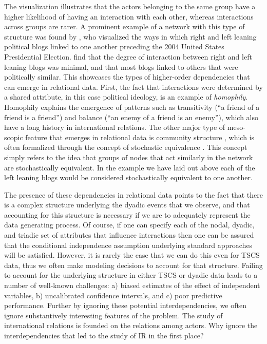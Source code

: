 The visualization illustrates that the actors belonging to the same group have a higher likelihood of having an interaction with each other, whereas interactions across groups are rarer. A prominent example of a network with this type of structure was found by \citet{adamic:glance:2005}, who visualized the ways in which right and left leaning political blogs linked to one another preceding the 2004 United States Presidential Election. \citeauthor{adamic:glance:2005} find that the degree of interaction between right and left leaning blogs was minimal, and that most blogs linked to others that were politically similar. This showcases the types of higher-order dependencies that can emerge in relational data. First, the fact that interactions were determined by a shared attribute, in this case political ideology, is an example of \textit{homophily}. Homophily explains the emergence of patterns such as transitivity (``a friend of a friend is a friend'') and balance (``an enemy of a friend is an enemy''), which also have a long history in international relations. The other major type of meso-scopic feature that emerges in relational data is community structure \citep{mucha:etal:2010}, which is often formalized through the concept of stochastic equivalence \citep{anderson:etal:1992}. This concept simply refers to the idea that groups of nodes that act similarly in the network are stochastically equivalent. In the example we have laid out above each of the left leaning blogs would be considered stochastically equivalent to one another. 

The presence of these dependencies in relational data points to the fact that there is a complex structure underlying the dyadic events that we observe, and that accounting for this structure is necessary if we are to adequately represent the data generating process. Of course, if one can specify each of the nodal, dyadic, and triadic set of attributes that influence interactions then one can be assured that the conditional independence assumption underlying standard approaches will be satisfied. However, it is rarely the case that we can do this even for TSCS data, thus we often make modeling decisions to account for that structure. Failing to account for the underlying structure in either TSCS or dyadic data leads to a number of well-known challenges: a) biased estimates of the effect of independent variables, b) uncalibrated confidence intervals, and c) poor predictive performance. Further by ignoring these potential interdependencies, we often ignore substantively interesting features of the problem. The study of international relations is founded on the relations among actors. Why ignore the interdependencies that led to the study of IR in the first place?

